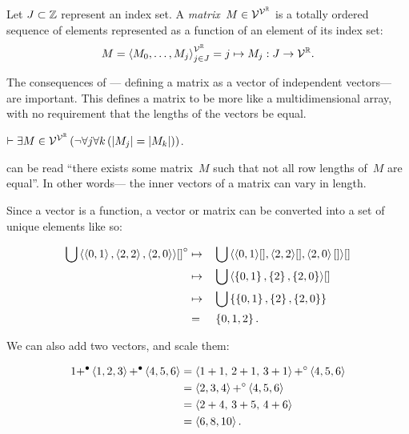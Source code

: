 \begin{definition}[Matrix]
  Let $J\subset\mathbb{Z}$ represent an index set.
  A \emph{matrix}~$M\in\mathcal{V}^{\mathcal{V}^{\mathbb{R}}}$ is a totally ordered sequence of
   elements represented as a function of an element of its index set:
  \begin{equation}
    M = \left\langle M_0,\ldots,M_j\right\rangle^{\mathcal{V}^{\mathbb{R}}}_{j\in J}
      = j \mapsto M_j : J \rightarrow \mathcal{V}^{\mathbb{R}}.
  \end{equation}
\end{definition}

The consequences of ---%
  defining a matrix as a vector of independent vectors---%
  are important.
This defines a matrix to be more like a multidimensional array,
  with no requirement that the lengths of the vectors be equal.

\begin{corollary}
  $\infer \Exists{M\in\Matrices}{\neg\Forall*{j}{\Forall{k}{\len{M_j} = \len{M_k}}}}$.
\end{corollary}

 can be read ``there exists some matrix~$M$ such that
  not all row lengths of~$M$ are equal''.
In other words---%
  the inner vectors of a matrix can vary in length.

Since a vector is a function,
  a vector or matrix can be converted into a set of unique elements like so:

\begin{alignat*}{2}
  \bigcup\left\langle\left\langle0,1\right\rangle,\left\langle2,2\right\rangle,\left\langle2,0\right\rangle\right\rangle\!{[]}^\circ
    &\mapsto &&\bigcup\left\langle\left\langle0,1\right\rangle\![],\left\langle2,2\right\rangle\![],\left\langle2,0\right\rangle[]\right\rangle\![] \\
    &\mapsto &&\bigcup\left\langle\left\{0,1\right\},\left\{2\right\},\left\{2,0\right\}\right\rangle\![] \\
    &\mapsto &&\bigcup\left\{\left\{0,1\right\},\left\{2\right\},\left\{2,0\right\}\right\} \\
    &=       &&\left\{0,1,2\right\}.
\end{alignat*}

We can also add two vectors, and scale them:

\begin{align*}
  1 {+}^\bullet \left\langle1,2,3\right\rangle {+}^\bullet \left\langle4,5,6\right\rangle
    &= \left\langle1+1,\, 2+1,\, 3+1\right\rangle {+}^\circ \left\langle4,5,6\right\rangle \\
    &= \left\langle2,3,4\right\rangle {+}^\circ \left\langle4,5,6\right\rangle \\
    &= \left\langle2+4,\, 3+5,\, 4+6\right\rangle \\
    &= \left\langle6, 8, 10\right\rangle.
\end{align*}


